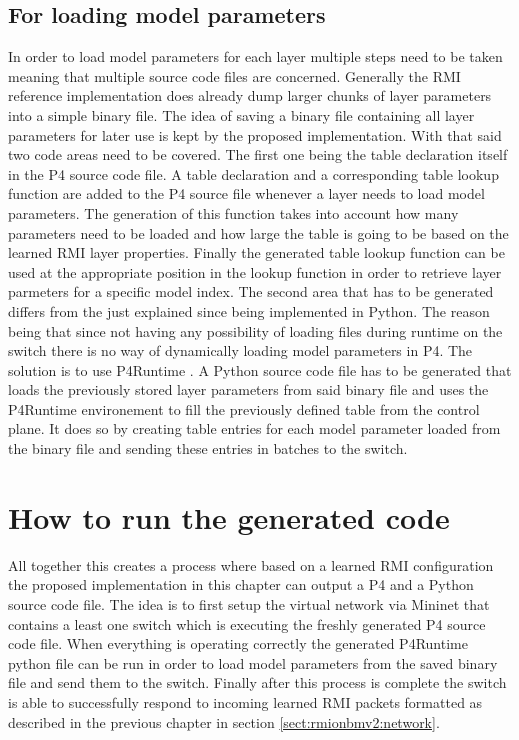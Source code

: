 \subsection{For loading model parameters}
\label{sect:rmiforp4:parameters}
In order to load model parameters for each layer multiple steps need to be taken meaning that multiple source code files are concerned. Generally the RMI reference implementation does already dump larger chunks of layer parameters into a simple binary file. The idea of saving a binary file containing all layer parameters for later use is kept by the proposed implementation. With that said two code areas need to be covered. The first one being the table declaration itself in the P4 source code file. A table declaration and a corresponding table lookup function are added to the P4 source file whenever a layer needs to load model parameters. The generation of this function takes into account how many parameters need to be loaded and how large the table is going to be based on the learned RMI layer properties. Finally the generated table lookup function can be used at the appropriate position in the lookup function in order to retrieve layer parmeters for a specific model index. The second area that has to be generated differs from the just explained since being implemented in Python. The reason being that since not having any possibility of loading files during runtime on the switch there is no way of dynamically loading model parameters in P4. The solution is to use P4Runtime \cite{p4runtime-spec}. A Python source code file has to be generated that loads the previously stored layer parameters from said binary file and uses the P4Runtime environement to fill the previously defined table from the control plane. It does so by creating table entries for each model parameter loaded from the binary file and sending these entries in batches to the switch.

\section{How to run the generated code}
All together this creates a process where based on a learned RMI configuration the proposed implementation in this chapter can output a P4 and a Python source code file. The idea is to first setup the virtual network via Mininet that contains a least one switch which is executing the freshly generated P4 source code file. When everything is operating correctly the generated P4Runtime python file can be run in order to load model parameters from the saved binary file and send them to the switch. Finally after this process is complete the switch is able to successfully respond to incoming learned RMI packets formatted as described in the previous chapter in section \ref{sect:rmionbmv2:network}.

